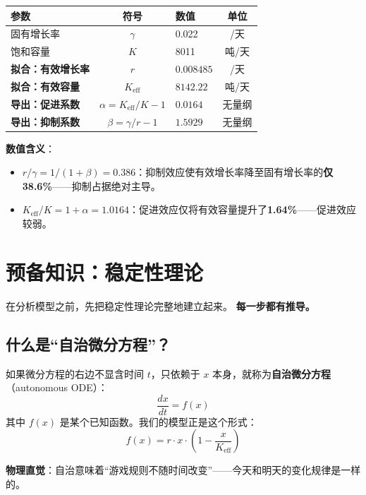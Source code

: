 \documentclass[12pt,a4paper]{article}
\begin{document}
\begin{center}
\begin{tabular}{lclc}
\toprule
参数 & 符号 & 数值 & 单位 \\
\midrule
固有增长率 & $\gamma$ & 0.022 & /天 \\
饱和容量 & $K$ & 8011 & 吨/天 \\
\textbf{拟合：有效增长率} & $r$ & $\mathbf{0.008485}$ & /天 \\
\textbf{拟合：有效容量} & $K_{\text{eff}}$ & $\mathbf{8142.22}$ & 吨/天 \\
\midrule
\textbf{导出：促进系数} & $\alpha = K_{\text{eff}}/K - 1$ & $\mathbf{0.0164}$ & 无量纲 \\
\textbf{导出：抑制系数} & $\beta = \gamma/r - 1$ & $\mathbf{1.5929}$ & 无量纲 \\
\bottomrule
\end{tabular}
\end{center}

\textbf{数值含义}：
\begin{itemize}
  \item $r/\gamma = 1/(1+\beta) = 0.386$：抑制效应使有效增长率降至固有增长率的\textbf{仅 38.6\%}——抑制占据绝对主导。
  \item $K_{\text{eff}}/K = 1+\alpha = 1.0164$：促进效应仅将有效容量提升了\textbf{1.64\%}——促进效应较弱。
\end{itemize}

\section{预备知识：稳定性理论}

在分析模型之前，先把稳定性理论完整地建立起来。
\textbf{每一步都有推导。}

\subsection{什么是``自治微分方程''？}

如果微分方程的右边不显含时间 $t$，只依赖于 $x$ 本身，就称为\textbf{自治微分方程}（autonomous ODE）：
\[
\frac{dx}{dt} = f(x)
\]
其中 $f(x)$ 是某个已知函数。我们的模型正是这个形式：
\[
f(x) = r \cdot x \cdot \left(1 - \frac{x}{K_{\text{eff}}}\right)
\]

\textbf{物理直觉}：自治意味着``游戏规则不随时间改变''——今天和明天的变化规律是一样的。
\end{document}
